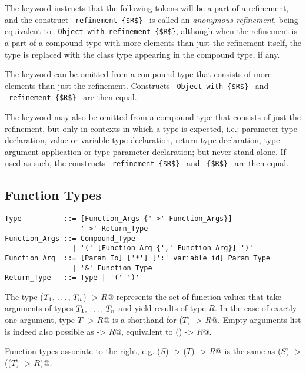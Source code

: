 The keyword  instructs that the following tokens will be a part of a refinement, and the construct ~\lstinline!refinement {$R$}!~ is called an {\em anonymous refinement}, being equivalent to ~\lstinline!Object with refinement {$R$}!, although when the refinement is a part of a compound type with more elements than just the refinement itself, the  type is replaced with the class type appearing in the compound type, if any. 

The  keyword can be omitted from a compound type that consists of more elements than just the refinement. Constructs ~\lstinline!Object with {$R$}!~ and ~\lstinline!refinement {$R$}!~ are then equal. 

The  keyword may also be omitted from a compound type that consists of just the refinement, but only in contexts in which a type is expected, i.e.: parameter type declaration, value or variable type declaration, return type declaration, type argument application or type parameter declaration; but never stand-alone. If used as such, the constructs ~\lstinline!refinement {$R$}!~ and ~\lstinline!{$R$}!~ are then equal. 






\subsection{Function Types}
\label{sec:function-types}

\syntax\begin{lstlisting}
Type          ::= [Function_Args {'->' Function_Args}] 
                  '->' Return_Type
Function_Args ::= Compound_Type
                | '(' [Function_Arg {',' Function_Arg}] ')'
Function_Arg  ::= [Param_Io] ['*'] [':' variable_id] Param_Type
                | '&' Function_Type
Return_Type   ::= Type | '(' ')'
\end{lstlisting}

The type \lstinline@($T_1 ,\, \ldots ,\, T_n$) -> $R$@ represents the set of function values that take arguments of types $T_1 ,\, \ldots ,\, T_n$ and yield results of type $R$. In the case of exactly one argument, type \lstinline@$T$ -> $R$@ is a shorthand for \lstinline@($T$) -> $R$@. Empty arguments list is indeed also possible as \lstinline@-> $R$@, equivalent to \lstinline@() -> $R$@.

Function types associate to the right, e.g. \lstinline@($S$) -> ($T$) -> $R$@ is the same as \lstinline@($S$) -> (($T$) -> $R$)@. 

